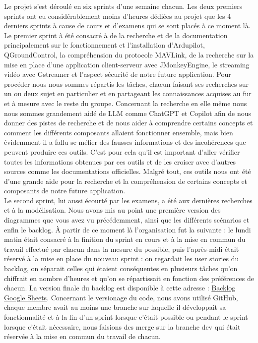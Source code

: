 \documentclass{scrartcl}
\begin{document}
Le projet s'est déroulé en six sprints d'une semaine chacun. Les deux premiers sprints ont eu considérablement moins
d'heures dédiées au projet que les 4 derniers sprints à cause de cours et d'examens qui se sont placés à ce moment là.
Le premier sprint à été consacré à de la recherche et de la documentation principalement sur le fonctionnement et l'installation d'Ardupilot, QGroundControl,
la compréhension du protocole MAVLink, de la recherche sur la mise en place d'une application client-serveur avec JMonkeyEngine,
le streaming vidéo avec Gstreamer et l'aspect sécurité de notre future application. Pour procéder nous nous sommes répartis les tâches, chacun faisant ses recherches
sur un ou deux sujet en particulier et en partageant les connaissances acquises au fur et à mesure avec le reste du groupe.
Concernant la recherche en elle même nous nous sommes grandement aidé de LLM comme ChatGPT et Copilot afin de nous donner des pistes de recherche et de
nous aider à comprendre certains concepts et comment les différents composants allaient fonctionner ensemble, mais bien évidemment il a fallu se méfier
des fausses informations et des incohérences que peuvent produire ces outils. C'est pour cela qu'il est important d'aller vérifier toutes les informations
obtenues par ces outils et de les croiser avec d'autres sources comme les documentations officielles.
Malgré tout, ces outils nous ont été d'une grande aide pour la recherche et la compréhension de certains concepts et composants de notre future application.\\

Le second sprint, lui aussi écourté par les examens, a été aux dernières recherches et à la modélisation. Nous avons mis au point
une première version des diagrammes que vous avez vu précédemment, ainsi que les différents scénarios et enfin le backlog.
À partir de ce moment là l'organisation fut la suivante : le lundi matin était consacré à la finition du sprint en cours
et à la mise en commun du travail effectué par chacun dans la mesure du possible, puis l'après-midi était réservé à la mise en place du nouveau sprint : on regardait les
user stories du backlog, on séparait celles qui étaient conséquentes en plusieurs tâches qu'on chiffrait en nombre d'heures et qu'on se répartissait en fonction des
préférences de chacun. La version finale du backlog est disponible à cette adresse : \href{https://docs.google.com/spreadsheets/d/1_9b835ZHfRBKW2wKLp_8N-aMPw3WcvQoGiQM7r9oeu4/edit?usp=sharing}{Backlog Google Sheets}.
Concernant le versionage du code, nous avons utilisé GitHub, chaque membre avait au moins une branche sur laquelle il développait sa fonctionnalité et à la fin d'un sprint lorsque c'était possible ou
pendant le sprint lorsque c'était nécessaire, nous faisions des merge sur la branche dev qui était réservée à la mise en commun du travail de chacun.\\
\end{document}
